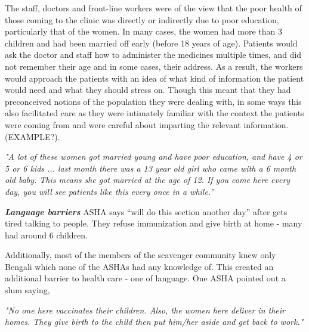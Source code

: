 The staff, doctors and front-line workers were of the view that the poor health of those coming to the clinic was directly or indirectly due to poor education, particularly that of the women. In many cases, the women had more than 3 children and had been married off early (before 18 years of age). Patients would ask the doctor and staff how to administer the medicines multiple times, and did not remember their age and in some cases, their address. As a result, the workers would approach the patients with an idea of what kind of information the patient would need and what they should stress on. Though this meant that they had preconceived notions of the population they were dealing with, in some ways this also facilitated care as they were intimately familiar with the context the patients were coming from and were careful about imparting the relevant information. (EXAMPLE?).

\textit{"A lot of these women got married young and have poor education, and have 4 or 5 or 6 kids ... last month there was a 13 year old girl who came with a 6 month old baby. This means she got married at the age of 12. If you come here every day, you will see patients like this every once in a while.”}

\textit{\textbf{Language barriers}}
ASHA says “will do this section another day” after gets tired talking to people. 
They refuse immunization and give birth at home - many had around 6 children.

Additionally, most of the members of the scavenger community knew only Bengali which none of the ASHAs had any knowledge of. This created an additional barrier to health care - one of language. One ASHA pointed out a slum saying,

\textit{"No one here vaccinates their children. Also, the women here deliver in their homes. They give birth to the child then put him/her aside and get back to work."} 




